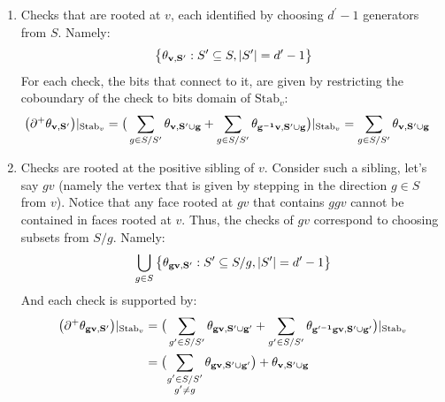 \begin{enumerate}
  \item Checks that are rooted at $v$, each identified by choosing $d^{\prime}-1$ generators from $S$. Namely: 
    \begin{equation*}
      \begin{split}
        \big\{ \mathbf{\theta_{v ,S^{\prime}}{} }{}: S^{\prime} \subseteq S , |S^{\prime}|=d^{\prime}-1  \big\} 
      \end{split}
    \end{equation*}
    For each check, the bits that connect to it, are given by restricting the coboundary of the check to bits domain of $\text{Stab}_{v}$:  
    \begin{equation*}
      \begin{split}
        \big( \partial^{+} \mathbf{\theta_{v ,S^{\prime}}{} }{} \big)|_{\text{Stab}_{v}} & =  \big(   \sum_{g \in S/S^{\prime}} \mathbf{\theta_{v ,S^{\prime} \cup g} } + \sum_{g \in S/S^{\prime}} \mathbf{\theta_{g^{-1}v ,S^{\prime}\cup g} }  \big)|_{\text{Stab}_{v}} =     \sum_{g \in S/S^{\prime}} \mathbf{\theta_{v ,S^{\prime} \cup g} } 
      \end{split}
    \end{equation*}
  \item Checks are rooted at the positive sibling of $v$. Consider such a sibling, let's say $gv$ (namely the vertex that is given by stepping in the direction $g \in S$ from $v$). Notice that any face rooted at $gv$ that contains $ggv$ cannot be contained in faces rooted at $v$. Thus, the checks of $gv$ correspond to choosing subsets from $S/g$. Namely:
    \begin{equation*}
      \begin{split}
      \bigcup_{g \in S}\big\{ \mathbf{\theta_{gv ,S^{\prime}} }: S^{\prime} \subseteq S/g , |S^{\prime}|=d^{\prime}-1  \big\}
      \end{split}
    \end{equation*}
    And each check is supported by:
    \begin{equation*}
      \begin{split}
        \big( \partial^{+} \rotfv{gv}{S^{\prime}} \big)|_{\text{Stab}_{v}} & = 
        \big(   \sum_{g^{\prime} \in S/S^{\prime}} \rotfv{gv}{S^{\prime} \cup g^{\prime}} + \sum_{g^{\prime} \in S/S^{\prime}} \rotfv{g^{\prime -1}gv}{S^{\prime}\cup g^{\prime}} \big)|_{\text{Stab}_{v}} \\
        &  =    \bigl(\sum_{ \substack{ g^{\prime} \in S/S^{\prime} \\ g^{\prime } \neq g }} \rotfv{g v}{S^{\prime} \cup g^{\prime}} \bigr) + \rotfv{v}{S^{\prime}\cup g}

\end{split}
\end{equation*}
\end{enumerate}
